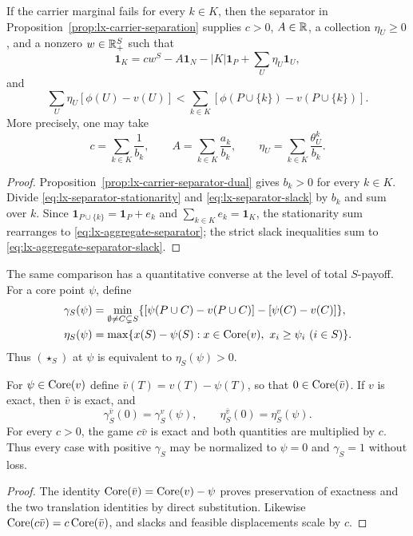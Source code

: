 \begin{corollary}
\label{cor:lx-aggregated-separator}
If the carrier marginal fails for every $k\in K$, then the separator in
Proposition~\ref{prop:lx-carrier-separation} supplies
$c>0$, $A\in\mathbb{R}$, a collection $\eta_U\geq0$, and a nonzero
$w\in\mathbb{R}^S_+$ such that
\[
 \mathbf1_K
 =c w^S-A\mathbf1_N-|K|\mathbf1_P
       +\sum_U\eta_U\mathbf1_U,
 \tag{AD1}\label{eq:lx-aggregate-separator}
\]
and
\[
 \sum_U\eta_U[\phi(U)-v(U)]
   <\sum_{k\in K}[\phi(P\cup\{k\})-v(P\cup\{k\})].
 \tag{AD2}\label{eq:lx-aggregate-separator-slack}
\]
More precisely, one may take
\[
 c=\sum_{k\in K}\frac1{b_k},\qquad
 A=\sum_{k\in K}\frac{a_k}{b_k},\qquad
 \eta_U=\sum_{k\in K}\frac{\theta_U^k}{b_k}.
\]
\end{corollary}

\begin{proof}
Proposition~\ref{prop:lx-carrier-separator-dual} gives $b_k>0$ for every
$k\in K$.  Divide \eqref{eq:lx-separator-stationarity} and
\eqref{eq:lx-separator-slack} by $b_k$ and sum over $k$.  Since
$\mathbf1_{P\cup\{k\}}=\mathbf1_P+e_k$ and
$\sum_{k\in K}e_k=\mathbf1_K$, the stationarity sum rearranges to
\eqref{eq:lx-aggregate-separator}; the strict slack inequalities sum to
\eqref{eq:lx-aggregate-separator-slack}.
\end{proof}

The same comparison has a quantitative converse at the level of total
$S$-payoff.  For a core point $\psi$, define
\begin{align*}
 \gamma_S(\psi)
  &=\min_{\emptyset\ne C\subsetneq S}
    \{[\psi(P\cup C)-v(P\cup C)]-[\psi(C)-v(C)]\},\\
 \eta_S(\psi)
  &=\max\{x(S)-\psi(S):x\in\operatorname{Core}(v),\ x_i\geq\psi_i\ (i\in S)\}.
\end{align*}
Thus $(\star_S)$ at $\psi$ is equivalent to $\eta_S(\psi)>0$.

\begin{lemma}
\label{lem:lx-carrier-normalization}
For $\psi\in\operatorname{Core}(v)$ define $\bar v(T)=v(T)-\psi(T)$, so that
$0\in\operatorname{Core}(\bar v)$.  If $v$ is exact, then $\bar v$ is exact, and
\[
 \gamma_S^{\bar v}(0)=\gamma_S^v(\psi),\qquad
 \eta_S^{\bar v}(0)=\eta_S^v(\psi).
\]
For every $c>0$, the game $c\bar v$ is exact and both quantities are
multiplied by $c$.  Thus every case with positive $\gamma_S$ may be
normalized to $\psi=0$ and $\gamma_S=1$ without loss.
\end{lemma}

\begin{proof}
The identity $\operatorname{Core}(\bar v)=\operatorname{Core}(v)-\psi$ proves preservation of exactness
and the two translation identities by direct substitution.  Likewise
$\operatorname{Core}(c\bar v)=c\operatorname{Core}(\bar v)$, and slacks and feasible displacements scale
by $c$.
\end{proof}

